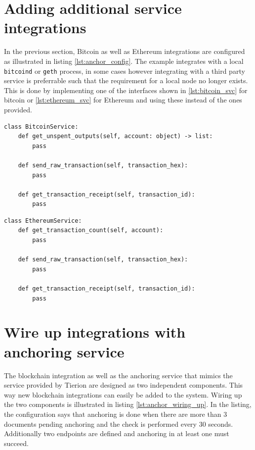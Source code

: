 \documentclass[12pt,msc,a4paper,oneside]{ucl_thesis}
\begin{document}
\section{Adding additional service integrations}
In the previous section, Bitcoin as well as Ethereum integrations are configured as illustrated in listing \ref{lst:anchor_config}. The example integrates with a local \texttt{bitcoind} or \texttt{geth} process, in some cases however integrating with a third party service is preferrable such that the requirement for a local node no longer exists. This is done by implementing one of the interfaces shown in \ref{lst:bitcoin_svc} for bitcoin or \ref{lst:ethereum_svc} for Ethereum and using these instead of the ones provided.

\begin{Code}
\begin{lstlisting}[style=myPython, caption=Bitcoin Service Interface, label=lst:bitcoin_svc]
class BitcoinService:
    def get_unspent_outputs(self, account: object) -> list:
        pass

    def send_raw_transaction(self, transaction_hex):
        pass

    def get_transaction_receipt(self, transaction_id):
        pass
\end{lstlisting}
\end{Code}

\begin{Code}
\begin{lstlisting}[style=myPython, caption=Ethereum Service Interface, label=lst:ethereum_svc]
class EthereumService:
    def get_transaction_count(self, account):
        pass

    def send_raw_transaction(self, transaction_hex):
        pass

    def get_transaction_receipt(self, transaction_id):
        pass
\end{lstlisting}
\end{Code}

\section{Wire up integrations with anchoring service} 
The blockchain integration as well as the anchoring service that mimics the service provided by Tierion are designed as two independent components. This way new blockchain integrations can easily be added to the system. Wiring up the two components is illustrated in listing \ref{lst:anchor_wiring_up}. In the listing, the configuration says that anchoring is done when there are more than 3 documents pending anchoring and the check is performed every 30 seconds. Additionally two endpoints are defined and anchoring in at least one must succeed.
\end{document}
